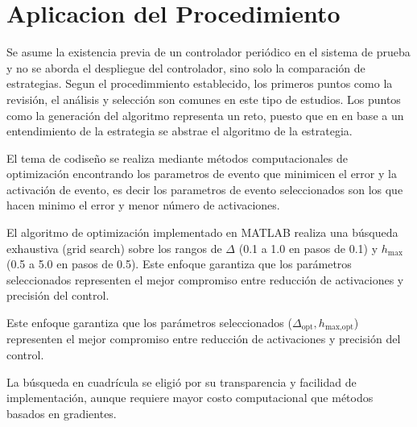 \documentclass[conference]{IEEEtran}
\begin{document}
\section{Aplicacion del Procedimiento}
Se asume la existencia previa de un controlador peri\'odico en el sistema de prueba y no se aborda el despliegue del controlador, sino solo la comparaci\'on de estrategias.
Segun el procedimmiento establecido, los primeros puntos como la revisi\'on, el an\'alisis y selecci\'on son comunes en este tipo de estudios. Los puntos como la generaci\'on del algoritmo representa un reto, puesto que en en base a un entendimiento de la estrategia se abstrae el algoritmo de la estrategia.

El tema de codiseño se realiza mediante m\'etodos computacionales de optimización encontrando los parametros de evento que minimicen el error y la activaci\'on de evento, es decir los parametros de evento seleccionados son los que hacen minimo el error y menor n\'umero de activaciones.

El algoritmo de optimización implementado en MATLAB realiza una búsqueda exhaustiva (grid search) sobre los rangos de $\Delta$ (0.1 a 1.0 en pasos de 0.1) y $h_{\text{max}}$ (0.5 a 5.0 en pasos de 0.5). Este enfoque garantiza que los parámetros seleccionados representen el mejor compromiso entre reducción de activaciones y precisión del control.

Este enfoque garantiza que los parámetros seleccionados ($\Delta_{\text{opt}}, h_{\text{max,opt}}$) representen el mejor compromiso entre reducción de activaciones y precisión del control.

La búsqueda en cuadrícula se eligió por su transparencia y facilidad de implementación, aunque requiere mayor costo computacional que métodos basados en gradientes.
\end{document}
